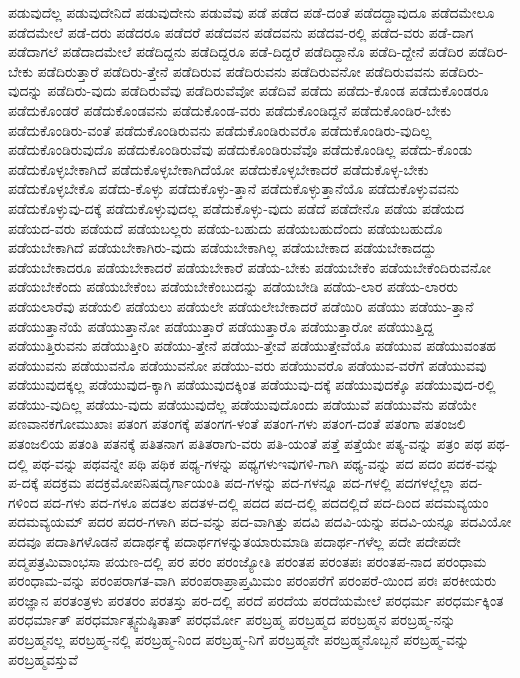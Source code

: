 {ಪಡುವುದೆಲ್ಲ
ಪಡುವುದೇನಿದೆ
ಪಡುವುದೇನು
ಪಡುವೆವು
ಪಡೆ
ಪಡೆದ
ಪಡೆ-ದಂತೆ
ಪಡೆದದ್ದಾವುದೂ
ಪಡೆದಮೇಲೂ
ಪಡೆದಮೇಲೆ
ಪಡೆ-ದರು
ಪಡೆದರೂ
ಪಡೆದರೆ
ಪಡೆದವನ
ಪಡೆದವನು
ಪಡೆದವ-ರಲ್ಲಿ
ಪಡೆದ-ವರು
ಪಡೆ-ದಾಗ
ಪಡೆದಾಗಲೆ
ಪಡೆದಾದಮೇಲೆ
ಪಡೆದಿದ್ದನು
ಪಡೆದಿದ್ದರೂ
ಪಡೆ-ದಿದ್ದರೆ
ಪಡೆದಿದ್ದಾನೊ
ಪಡೆದಿ-ದ್ದೇನೆ
ಪಡೆದಿರ
ಪಡೆದಿರ-ಬೇಕು
ಪಡೆದಿರುತ್ತಾರೆ
ಪಡೆದಿರು-ತ್ತೇನೆ
ಪಡೆದಿರುವ
ಪಡೆದಿರುವನು
ಪಡೆದಿರುವನೋ
ಪಡೆದಿರುವವನು
ಪಡೆದಿರು-ವುದನ್ನು
ಪಡೆದಿರು-ವುದು
ಪಡೆದಿರುವೆವು
ಪಡೆದಿರುವೆವೋ
ಪಡೆದಿವೆ
ಪಡೆದು
ಪಡೆದು-ಕೊಂಡ
ಪಡೆದುಕೊಂಡರೂ
ಪಡೆದುಕೊಂಡರೆ
ಪಡೆದುಕೊಂಡವನು
ಪಡೆದುಕೊಂಡ-ವರು
ಪಡೆದುಕೊಂಡಿದ್ದನೆ
ಪಡೆದುಕೊಂಡಿರ-ಬೇಕು
ಪಡೆದುಕೊಂಡಿರು-ವಂತೆ
ಪಡೆದುಕೊಂಡಿರುವನು
ಪಡೆದುಕೊಂಡಿರುವರೊ
ಪಡೆದುಕೊಂಡಿರು-ವುದಿಲ್ಲ
ಪಡೆದುಕೊಂಡಿರುವುದೊ
ಪಡೆದುಕೊಂಡಿರುವೆವು
ಪಡೆದುಕೊಂಡಿರುವೆವೊ
ಪಡೆದುಕೊಂಡಿಲ್ಲ
ಪಡೆದು-ಕೊಂಡು
ಪಡೆದುಕೊಳ್ಳಬೇಕಾಗಿದೆ
ಪಡೆದುಕೊಳ್ಳಬೇಕಾಗಿದೆಯೋ
ಪಡೆದುಕೊಳ್ಳಬೇಕಾದರೆ
ಪಡೆದುಕೊಳ್ಳ-ಬೇಕು
ಪಡೆದುಕೊಳ್ಳಬೇಕೊ
ಪಡೆದು-ಕೊಳ್ಳು
ಪಡೆದುಕೊಳ್ಳು-ತ್ತಾನೆ
ಪಡೆದುಕೊಳ್ಳುತ್ತಾನೆಯೊ
ಪಡೆದುಕೊಳ್ಳುವವನು
ಪಡೆದುಕೊಳ್ಳುವು-ದಕ್ಕೆ
ಪಡೆದುಕೊಳ್ಳುವುದಲ್ಲ
ಪಡೆದುಕೊಳ್ಳು-ವುದು
ಪಡೆದೆ
ಪಡೆದೇನೊ
ಪಡೆಯ
ಪಡೆಯದ
ಪಡೆಯದ-ವರು
ಪಡೆಯದೆ
ಪಡೆಯಬಲ್ಲರು
ಪಡೆಯ-ಬಹುದು
ಪಡೆಯಬಹುದೆಂದು
ಪಡೆಯಬಹುದೊ
ಪಡೆಯಬೇಕಾಗಿದೆ
ಪಡೆಯಬೇಕಾಗಿರು-ವುದು
ಪಡೆಯಬೇಕಾಗಿಲ್ಲ
ಪಡೆಯಬೇಕಾದ
ಪಡೆಯಬೇಕಾದದ್ದು
ಪಡೆಯಬೇಕಾದರೂ
ಪಡೆಯಬೇಕಾದರೆ
ಪಡೆಯಬೇಕಾರೆ
ಪಡೆಯ-ಬೇಕು
ಪಡೆಯಬೇಕೆಂ
ಪಡೆಯಬೇಕೆಂದಿರುವನೋ
ಪಡೆಯಬೇಕೆಂದು
ಪಡೆಯಬೇಕೆಂಬ
ಪಡೆಯಬೇಕೆಂಬುದನ್ನು
ಪಡೆಯಬೇಡಿ
ಪಡೆಯ-ಲಾರ
ಪಡೆಯ-ಲಾರರು
ಪಡೆಯಲಾರೆವು
ಪಡೆಯಲಿ
ಪಡೆಯಲು
ಪಡೆಯಲೇ
ಪಡೆಯಲೇಬೇಕಾದರೆ
ಪಡೆಯಿರಿ
ಪಡೆಯು
ಪಡೆಯು-ತ್ತಾನೆ
ಪಡೆಯುತ್ತಾನೆಯೆ
ಪಡೆಯುತ್ತಾನೋ
ಪಡೆಯುತ್ತಾರೆ
ಪಡೆಯುತ್ತಾರೊ
ಪಡೆಯುತ್ತಾರೋ
ಪಡೆಯುತ್ತಿದ್ದ
ಪಡೆಯುತ್ತಿರುವನು
ಪಡೆಯುತ್ತೀರಿ
ಪಡೆಯು-ತ್ತೇನೆ
ಪಡೆಯು-ತ್ತೇವೆ
ಪಡೆಯುತ್ತೇವೆಯೊ
ಪಡೆಯುವ
ಪಡೆಯುವಂತಹ
ಪಡೆಯುವನು
ಪಡೆಯುವನೊ
ಪಡೆಯುವನೋ
ಪಡೆಯು-ವರು
ಪಡೆಯುವರೊ
ಪಡೆಯುವ-ವರೆಗೆ
ಪಡೆಯುವವು
ಪಡೆಯುವುದಕ್ಕಲ್ಲ
ಪಡೆಯುವುದ-ಕ್ಕಾಗಿ
ಪಡೆಯುವುದಕ್ಕಿಂತ
ಪಡೆಯುವು-ದಕ್ಕೆ
ಪಡೆಯುವುದಕ್ಕೊ
ಪಡೆಯುವುದ-ರಲ್ಲಿ
ಪಡೆಯು-ವುದಿಲ್ಲ
ಪಡೆಯು-ವುದು
ಪಡೆಯುವುದೆಲ್ಲ
ಪಡೆಯುವುದೊಂದು
ಪಡೆಯುವೆ
ಪಡೆಯುವೆನು
ಪಡೆಯೇ
ಪಣವಾನಕಗೋಮುಖಾಃ
ಪತಂಗ
ಪತಂಗಕ್ಕೆ
ಪತಂಗಗ-ಳಂತೆ
ಪತಂಗ-ಗಳು
ಪತಂಗ-ದಂತೆ
ಪತಂಗಾ
ಪತಂಜಲಿ
ಪತಂಜಲಿಯ
ಪತಂತಿ
ಪತನಕ್ಕೆ
ಪತಿತನಾಗ
ಪತಿತರಾಗು-ವರು
ಪತಿ-ಯಂತೆ
ಪತ್ತೆ
ಪತ್ತೆಯೇ
ಪತ್ಯ-ವನ್ನು
ಪತ್ರಂ
ಪಥ
ಪಥ-ದಲ್ಲಿ
ಪಥ-ವನ್ನು
ಪಥವನ್ನೇ
ಪಥಿ
ಪಥಿಕ
ಪಥ್ಯ-ಗಳನ್ನು
ಪಥ್ಯಗಳುಇವುಗಳಿ-ಗಾಗಿ
ಪಥ್ಯ-ವನ್ನು
ಪದ
ಪದಂ
ಪದಕ-ವನ್ನು
ಪ-ದಕ್ಕೆ
ಪದಕ್ರಮ
ಪದಕ್ರಮೋಪನಿಷದೈರ್ಗಾಯಂತಿ
ಪದ-ಗಳನ್ನು
ಪದ-ಗಳನ್ನೂ
ಪದ-ಗಳಲ್ಲಿ
ಪದಗಳಲ್ಲೆಲ್ಲಾ
ಪದ-ಗಳಿಂದ
ಪದ-ಗಳು
ಪದ-ಗಳೂ
ಪದತಲ
ಪದತಳ-ದಲ್ಲಿ
ಪದದ
ಪದ-ದಲ್ಲಿ
ಪದದಲ್ಲಿದೆ
ಪದ-ದಿಂದ
ಪದಮವ್ಯಯಂ
ಪದಮವ್ಯಯಮ್
ಪದರ
ಪದರ-ಗಳಾಗಿ
ಪದ-ವನ್ನು
ಪದ-ವಾಗಿತ್ತು
ಪದವಿ
ಪದವಿ-ಯನ್ನು
ಪದವಿ-ಯನ್ನೂ
ಪದವಿಯೋ
ಪದವೂ
ಪದಾತಿಗಳೊಡನೆ
ಪದಾರ್ಥಕ್ಕೆ
ಪದಾರ್ಥಗಳನ್ನುತಯಾರುಮಾಡಿ
ಪದಾರ್ಥ-ಗಳೆಲ್ಲ
ಪದೇ
ಪದೇಪದೇ
ಪದ್ಮಪತ್ರಮಿವಾಂಭಸಾ
ಪಯಣ-ದಲ್ಲಿ
ಪರ
ಪರಂ
ಪರಂಜ್ಯೋತಿ
ಪರಂತಪ
ಪರಂತಪಃ
ಪರಂತಪ-ನಾದ
ಪರಂಧಾಮ
ಪರಂಧಾಮ-ವನ್ನು
ಪರಂಪರಾಗತ-ವಾಗಿ
ಪರಂಪರಾಪ್ರಾಪ್ತಮಿಮಂ
ಪರಂಪರೆಗೆ
ಪರಂಪರೆ-ಯಿಂದ
ಪರಃ
ಪರಕೀಯರು
ಪರಜ್ಞಾನ
ಪರತಂತ್ರಳು
ಪರತರಂ
ಪರತಸ್ತು
ಪರ-ದಲ್ಲಿ
ಪರದೆ
ಪರದೆಯ
ಪರದೆಯಮೇಲೆ
ಪರಧರ್ಮ
ಪರಧರ್ಮಕ್ಕಿಂತ
ಪರಧರ್ಮಾತ್
ಪರಧರ್ಮಾತ್ಸ್ವನುಷ್ಠಿತಾತ್
ಪರಧರ್ಮೋ
ಪರಬ್ರಹ್ಮ
ಪರಬ್ರಹ್ಮದ
ಪರಬ್ರಹ್ಮನ
ಪರಬ್ರಹ್ಮ-ನನ್ನು
ಪರಬ್ರಹ್ಮನಲ್ಲ
ಪರಬ್ರಹ್ಮ-ನಲ್ಲಿ
ಪರಬ್ರಹ್ಮ-ನಿಂದ
ಪರಬ್ರಹ್ಮ-ನಿಗೆ
ಪರಬ್ರಹ್ಮನೇ
ಪರಬ್ರಹ್ಮನೊಬ್ಬನೆ
ಪರಬ್ರಹ್ಮ-ವನ್ನು
ಪರಬ್ರಹ್ಮವಸ್ತುವೆ
}
